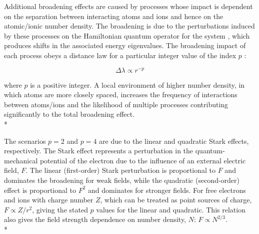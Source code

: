\documentclass[12pt, a4paper]{report}
\begin{document}

Additional broadening effects are caused by processes whose impact is dependent on the separation between interacting atoms and ions and hence on the atomic/ionic number density. The broadening is due to the perturbations induced by these processes on the Hamiltonian quantum operator for the system \citep{1929ApJ....69..173S}, which produces shifts in the associated energy eigenvalues. The broadening impact of each process obeys a distance law for a particular integer value of the index $p$ \citep{Peach_1984}:

\begin{equation}
\Delta \lambda \propto r^{-p}
\label{broadening_dist}
\end{equation}

where $p$ is a positive integer. A local environment of higher number density, in which atoms are more closely spaced, increases the frequency of interactions between atoms/ions and the likelihood of multiple processes contributing significantly to the total broadening effect. \\*

The scenarios $p = 2$ and $p = 4$ are due to the linear and quadratic Stark effects, respectively. The Stark effect represents a perturbation in the quantum-mechanical potential of the electron due to the influence of an external electric field, $F$. The linear (first-order) Stark perturbation is proportional to $F$ and dominates the broadening for weak fields, while the quadratic (second-order) effect is proportional to $F^{2}$ and dominates for stronger fields. For free electrons and ions with charge number $Z$, which can be treated as point sources of charge, $F \propto Z/r^{2}$, giving the stated $p$ values for the linear and quadratic. This relation also gives the field strength dependence on number density, $N$: $F \propto N^{2/3}$.\\*
\end{document}
